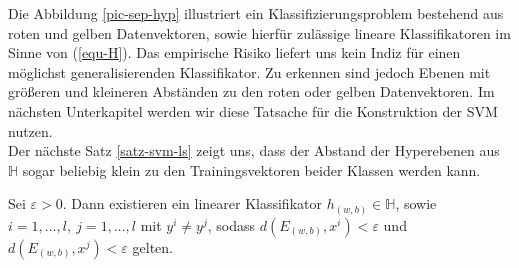 Die Abbildung \ref{pic-sep-hyp} illustriert ein Klassifizierungsproblem bestehend aus roten und gelben Datenvektoren, sowie hierfür zulässige lineare Klassifikatoren im Sinne von (\ref{equ-H}). Das empirische Risiko liefert uns kein Indiz für einen möglichst generalisierenden Klassifikator. Zu erkennen sind jedoch Ebenen mit größeren und kleineren Abständen zu den roten oder gelben Datenvektoren. Im nächsten Unterkapitel werden wir diese Tatsache für die Konstruktion der SVM nutzen. \\

Der nächste Satz \ref{satz-svm-ls} zeigt uns, dass der Abstand der Hyperebenen aus $\mathbb{H}$ sogar beliebig klein zu den Trainingsvektoren beider Klassen werden kann. 
\begin{satz}
	\label{satz-svm-ls}
	Sei $\varepsilon > 0$. Dann existieren ein linearer Klassifikator $h_{(w,b)} \in \mathbb{H}$, sowie $i = 1,...,l,\ j = 1,...,l$ mit $y^i \neq y^j$, sodass $d(E_{(w,b)},x^i) < \varepsilon$ und $d(E_{(w,b)},x^j) < \varepsilon$ gelten.
\end{satz}
